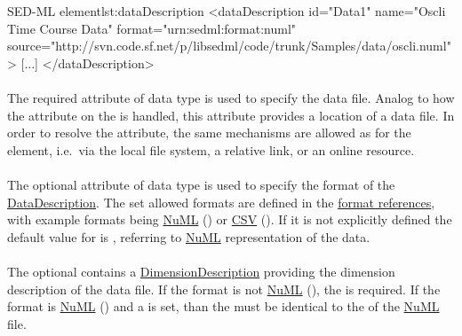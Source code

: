 \begin{myXmlLst}{SED-ML  element}{lst:dataDescription}
<dataDescription id="Data1" name="Oscli Time Course Data" format="urn:sedml:format:numl"
	source="http://svn.code.sf.net/p/libsedml/code/trunk/Samples/data/oscli.numl" >
    [...]
</dataDescription>
\end{myXmlLst} 

\paragraph*{}
\label{sec:data_source}
The required  attribute of data type \hyperref[type:anyURI]{} is used to specify the data file. Analog to how the \hyperref[sec:model_source]{} attribute on the \SedModel is handled, this attribute provides a location of a data file. In order to resolve the  attribute, the same mechanisms are allowed as for the \SedModel \hyperref[sec:model_source]{} element, i.e.\, via the local file system, a relative link, or an online resource.

\paragraph*{}
\label{sec:format}
The optional  attribute of data type \hyperref[type:anyURI]{} is used to specify the format of the \hyperref[class:dataDescription]{DataDescription}. The set allowed formats are defined in the \hyperref[sec:dataFormatURI]{format references}, with example formats being \hyperref[sec:dataFormatNUML]{NuML} () or \hyperref[sec:dataFormatCSV]{CSV} (). If it is not explicitly defined the default value for  is , referring to \hyperref[sec:dataFormatNUML]{NuML} representation of the data.

\paragraph*{}
\label{sec:dimensionDescription}
The optional  contains a \hyperref[class:dimensionDescription]{DimensionDescription} providing the dimension description of the data file. If the format is not \hyperref[sec:dataFormatNUML]{NuML} (), the  is required. If the format is \hyperref[sec:dataFormatNUML]{NuML} () and a  is set, than the  must be identical to the  of the \hyperref[sec:dataFormatNUML]{NuML} file.

